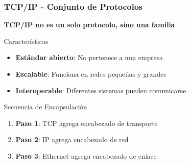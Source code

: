 \documentclass[aspectratio=169]{beamer}
\begin{document}
          \begin{frame}
            \frametitle{TCP/IP - Conjunto de Protocolos}
            
            \begin{center}
            \Large \textbf{TCP/IP no es un solo protocolo, sino una familia}
            \end{center}
            \begin{block}{Características}
            \begin{itemize}
            \item \textbf{Estándar abierto}: No pertenece a una empresa
            \item \textbf{Escalable}: Funciona en redes pequeñas y grandes
            \item \textbf{Interoperable}: Diferentes sistemas pueden comunicarse
            \end{itemize}
            \end{block}
           
            \begin{block}{Secuencia de Encapsulación}
            \begin{enumerate}
            \item \textbf{Paso 1}: TCP agrega encabezado de transporte
            \item \textbf{Paso 2}: IP agrega encabezado de red
            \item \textbf{Paso 3}: Ethernet agrega encabezado de enlace
            \end{enumerate}
            \end{block}
            \end{frame}
            
\end{document}
